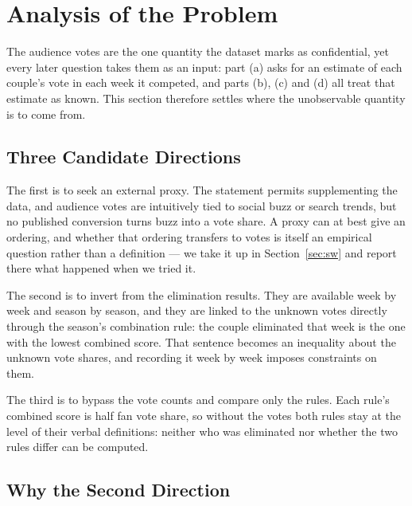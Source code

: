 \section{Analysis of the Problem}
\label{sec:analysis}


The audience votes are the one quantity the dataset marks as confidential, yet every later question takes them as an input: part (a) asks for an estimate of each couple's vote in each week it competed, and parts (b), (c) and (d) all treat that estimate as known. This section therefore settles where the unobservable quantity is to come from.

\subsection{Three Candidate Directions}

The first is to seek an external proxy. The statement permits supplementing the data, and audience votes are intuitively tied to social buzz or search trends, but no published conversion turns buzz into a vote share. A proxy can at best give an ordering, and whether that ordering transfers to votes is itself an empirical question rather than a definition --- we take it up in Section~\ref{sec:sw} and report there what happened when we tried it.

The second is to invert from the elimination results. They are available week by week and season by season, and they are linked to the unknown votes directly through the season's combination rule: the couple eliminated that week is the one with the lowest combined score. That sentence becomes an inequality about the unknown vote shares, and recording it week by week imposes constraints on them.

The third is to bypass the vote counts and compare only the rules. Each rule's combined score is half fan vote share, so without the votes both rules stay at the level of their verbal definitions: neither who was eliminated nor whether the two rules differ can be computed.

\subsection{Why the Second Direction}

